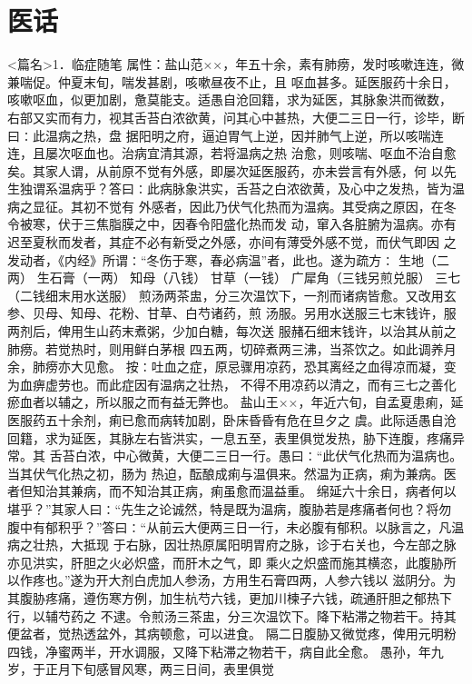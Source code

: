 \documentclass[a4paper,12pt,UTF8,twoside]{ctexbook}
\begin{document}
\part{医话}
<篇名>1．临症随笔
属性：盐山范××，年五十余，素有肺痨，发时咳嗽连连，微兼喘促。仲夏末旬，喘发甚剧，咳嗽昼夜不止，且 
呕血甚多。延医服药十余日，咳嗽呕血，似更加剧，惫莫能支。适愚自沧回籍，求为延医，其脉象洪而微数， 
右部又实而有力，视其舌苔白浓欲黄，问其心中甚热，大便二三日一行，诊毕，断曰∶此温病之热，盘 
据阳明之府，逼迫胃气上逆，因并肺气上逆，所以咳喘连连，且屡次呕血也。治病宜清其源，若将温病之热 
治愈，则咳喘、呕血不治自愈矣。其家人谓，从前原不觉有外感，即屡次延医服药，亦未尝言有外感，何 
以先生独谓系温病乎？答曰∶此病脉象洪实，舌苔之白浓欲黄，及心中之发热，皆为温病之显征。其初不觉有 
外感者，因此乃伏气化热而为温病。其受病之原因，在冬令被寒，伏于三焦脂膜之中，因春令阳盛化热而发 
动，窜入各脏腑为温病。亦有迟至夏秋而发者，其症不必有新受之外感，亦间有薄受外感不觉，而伏气即因 
之发动者，《内经》所谓∶“冬伤于寒，春必病温”者，此也。遂为疏方∶ 
生地（二两） 生石膏（一两） 知母（八钱） 甘草（一钱） 
广犀角（三钱另煎兑服） 三七（二钱细末用水送服） 
煎汤两茶盅，分三次温饮下，一剂而诸病皆愈。又改用玄参、贝母、知母、花粉、甘草、白芍诸药，煎 
汤服。另用水送服三七末钱许，服两剂后，俾用生山药末煮粥，少加白糖，每次送 
服赭石细末钱许，以治其从前之肺痨。若觉热时，则用鲜白茅根 
四五两，切碎煮两三沸，当茶饮之。如此调养月余，肺痨亦大见愈。 
按∶吐血之症，原忌骤用凉药，恐其离经之血得凉而凝，变为血痹虚劳也。而此症因有温病之壮热， 
不得不用凉药以清之，而有三七之善化瘀血者以辅之，所以服之而有益无弊也。 
盐山王××，年近六旬，自孟夏患痢，延医服药五十余剂，痢已愈而病转加剧，卧床昏昏有危在旦夕之 
虞。此际适愚自沧回籍，求为延医，其脉左右皆洪实，一息五至，表里俱觉发热，胁下连腹，疼痛异常。其 
舌苔白浓，中心微黄，大便二三日一行。愚曰∶“此伏气化热而为温病也。当其伏气化热之初，肠为 
热迫，酝酿成痢与温俱来。然温为正病，痢为兼病。医者但知治其兼病，而不知治其正病，痢虽愈而温益重。 
绵延六十余日，病者何以堪乎？”其家人曰∶“先生之论诚然，特是既为温病，腹胁若是疼痛者何也？将勿 
腹中有郁积乎？”答曰∶“从前云大便两三日一行，未必腹有郁积。以脉言之，凡温病之壮热，大抵现 
于右脉，因壮热原属阳明胃府之脉，诊于右关也，今左部之脉亦见洪实，肝胆之火必炽盛，而肝木之气，即 
乘火之炽盛而施其横恣，此腹胁所以作疼也。”遂为开大剂白虎加人参汤，方用生石膏四两，人参六钱以 
滋阴分。为其腹胁疼痛，遵伤寒方例，加生杭芍六钱，更加川楝子六钱，疏通肝胆之郁热下行，以辅芍药之 
不逮。令煎汤三茶盅，分三次温饮下。降下粘滞之物若干。持其便盆者，觉热透盆外，其病顿愈，可以进食。 
隔二日腹胁又微觉疼，俾用元明粉四钱，净蜜两半，开水调服，又降下粘滞之物若干，病自此全愈。 
愚孙，年九岁，于正月下旬感冒风寒，两三日间，表里俱觉 
\end{document}

